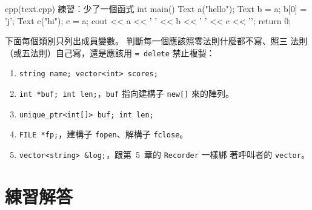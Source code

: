 \begin{drills}[label=drills:ch6]
\begin{code}{cpp}{(text.cpp) 練習：少了一個函式}
int main() {
    Text a("hello");
    Text b = a;
    b[0] = 'j';
    Text c("hi");
    c = a;
    cout << a << ' ' << b << ' ' << c << '\n';
    return 0;
}
\end{code}
\item 下面每個類別只列出成員變數。 判斷每一個應該照零法則什麼都不寫、照三
法則（或五法則）自己寫，還是應該用 \texttt{= delete} 禁止複製：
\begin{enumerate}
\item \texttt{string name; vector<int> scores;}
\item \texttt{int *buf; int len;}，\texttt{buf} 指向建構子 \texttt{new[]}
來的陣列。
\item \texttt{unique\_ptr<int[]> buf; int len;}
\item \texttt{FILE *fp;}，建構子 \texttt{fopen}、解構子 \texttt{fclose}。
\item \texttt{vector<string> \&log;}，跟第~5~章的 \texttt{Recorder} 一樣綁
著呼叫者的 \texttt{vector}。
\end{enumerate}
\end{drills}

\section*{練習解答}


